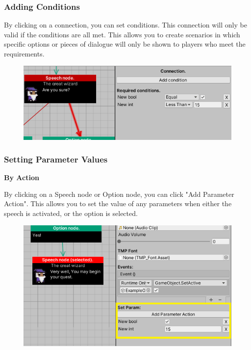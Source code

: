 \documentclass[a4paper,12pt]{article}
\begin{document}
\subsubsection{Adding Conditions}
By clicking on a connection, you can set conditions. This connection will only be valid if the conditions are all met. This allows you to create scenarios in which specific options or pieces of dialogue will only be shown to players who meet the requirements. 

\begin{figure}[h]
\centering
\includegraphics[keepaspectratio]{img/ConnectionConditions.png}
\end{figure}
\newpage

\subsubsection{Setting Parameter Values}

\textbf{By Action}
\bigskip

By clicking on a Speech node or Option node, you can click "Add Parameter Action". This allows you to set the value of any parameters when either the speech is activated, or the option is selected.

\begin{figure}[hb]
\centering
\includegraphics[keepaspectratio]{img/SetParam.png}
\end{figure}
\bigskip
\end{document}
